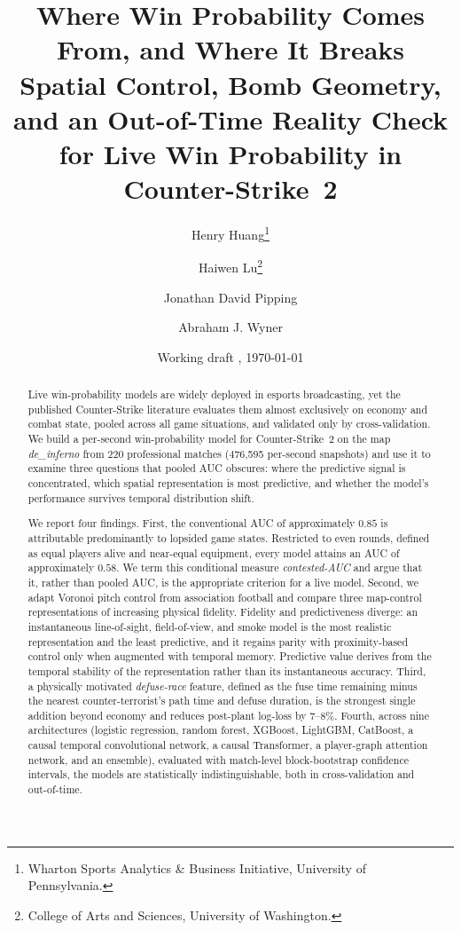 \documentclass[11pt,a4paper]{article}
\title{\textbf{Where Win Probability Comes From, and Where It Breaks}\\[2mm]
\large Spatial Control, Bomb Geometry, and an Out-of-Time Reality Check
for Live Win Probability in Counter-Strike~2}
\author{Henry Huang\thanks{Wharton Sports Analytics \& Business Initiative,
University of Pennsylvania. }
\and Haiwen Lu\thanks{College of Arts and Sciences, University of Washington.}
\and Jonathan David Pipping\footnotemark[1]
\and Abraham J. Wyner\footnotemark[1]}
\date{Working draft \textbf{\draftversion}, \today}
\begin{document}
\maketitle

\begin{abstract}
\noindent
Live win-probability models are widely deployed in esports broadcasting, yet the
published Counter-Strike literature evaluates them almost exclusively on economy and
combat state, pooled across all game situations, and validated only by
cross-validation. We build a per-second win-probability model for Counter-Strike~2
on the map \textit{de\_inferno} from 220 professional matches (476{,}595 per-second
snapshots) and use it to examine three questions that pooled AUC obscures: where the
predictive signal is concentrated, which spatial representation is most predictive,
and whether the model's performance survives temporal distribution shift.

We report four findings. First, the conventional AUC of approximately $0.85$ is
attributable predominantly to lopsided game states. Restricted to even rounds, defined
as equal players alive and near-equal equipment, every model attains an AUC of
approximately $0.58$. We term this conditional measure \emph{contested-AUC} and argue
that it, rather than pooled AUC, is the appropriate criterion for a live model. Second,
we adapt Voronoi pitch control from association football and compare three map-control
representations of increasing physical fidelity. Fidelity and predictiveness diverge:
an instantaneous line-of-sight, field-of-view, and smoke model is the most realistic
representation and the least predictive, and it regains parity with proximity-based
control only when augmented with temporal memory. Predictive value derives from the
temporal stability of the representation rather than its instantaneous accuracy. Third,
a physically motivated \emph{defuse-race} feature, defined as the fuse time remaining
minus the nearest counter-terrorist's path time and defuse duration, is the strongest
single addition beyond economy and reduces post-plant log-loss by 7--8\%. Fourth, across
nine architectures (logistic regression, random forest, XGBoost, LightGBM, CatBoost, a
causal temporal convolutional network, a causal Transformer, a player-graph attention
network, and an ensemble), evaluated with match-level block-bootstrap confidence
intervals, the models are statistically indistinguishable, both in cross-validation and
out-of-time.


\end{abstract}
\end{document}
